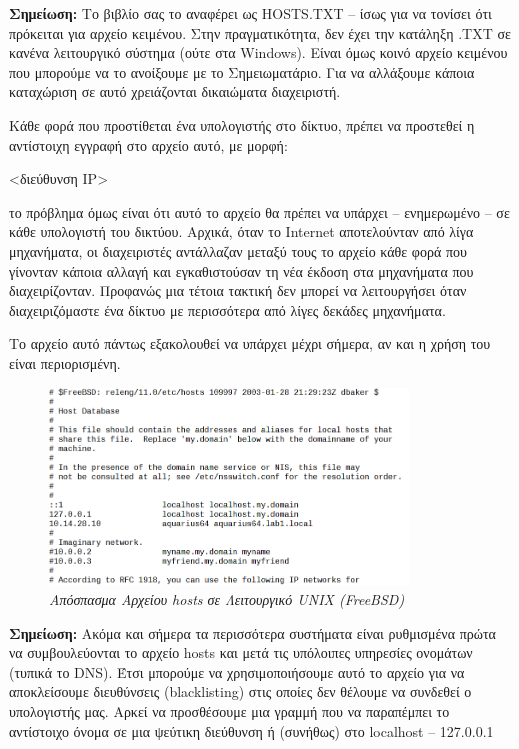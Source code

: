 \begin{inthebox}
\textbf{Σημείωση:} Το βιβλίο σας το αναφέρει ως HOSTS.TXT -- ίσως για να τονίσει ότι πρόκειται για αρχείο κειμένου. Στην πραγματικότητα, δεν έχει την κατάληξη .TXT σε κανένα λειτουργικό σύστημα (ούτε στα Windows). Είναι όμως κοινό αρχείο κειμένου που μπορούμε να το ανοίξουμε με το Σημειωματάριο. Για να αλλάξουμε κάποια καταχώριση σε αυτό χρειάζονται δικαιώματα διαχειριστή.\\
\end{inthebox}

Κάθε φορά που προστίθεται ένα υπολογιστής στο δίκτυο, πρέπει να προστεθεί η αντίστοιχη εγγραφή στο αρχείο αυτό, με μορφή:

<διεύθυνση IP>	 

το πρόβλημα όμως είναι ότι αυτό το αρχείο θα πρέπει να υπάρχει -- ενημερωμένο -- σε κάθε υπολογιστή του δικτύου. Αρχικά, όταν το Internet αποτελούνταν από λίγα μηχανήματα, οι διαχειριστές αντάλλαζαν μεταξύ τους το αρχείο κάθε φορά που γίνονταν κάποια αλλαγή και εγκαθιστούσαν τη νέα έκδοση στα μηχανήματα που διαχειρίζονταν. Προφανώς μια τέτοια τακτική δεν μπορεί να λειτουργήσει όταν διαχειριζόμαστε ένα δίκτυο με περισσότερα από λίγες δεκάδες μηχανήματα.

Το αρχείο αυτό πάντως εξακολουθεί να υπάρχει μέχρι σήμερα, αν και η χρήση του είναι περιορισμένη.

\begin{figure}[!ht]
 \centering
 \includegraphics[width=0.85\textwidth]{images/chapter3/3-20}
 \caption {\textsl{Απόσπασμα Αρχείου hosts σε Λειτουργικό UNIX (FreeBSD)}}
 \label{3-20}
\end{figure}

\begin{inthebox}
\textbf{Σημείωση:} Ακόμα και σήμερα τα περισσότερα συστήματα είναι ρυθμισμένα πρώτα να συμβουλεύονται το αρχείο hosts και μετά τις υπόλοιπες υπηρεσίες ονομάτων (τυπικά το DNS). Έτσι μπορούμε να χρησιμοποιήσουμε αυτό το αρχείο για να αποκλείσουμε διευθύνσεις (blacklisting) στις οποίες δεν θέλουμε να συνδεθεί ο υπολογιστής μας. Αρκεί να προσθέσουμε μια γραμμή που να παραπέμπει το αντίστοιχο όνομα σε μια ψεύτικη διεύθυνση ή (συνήθως) στο localhost -- 127.0.0.1\\
\end{inthebox}

